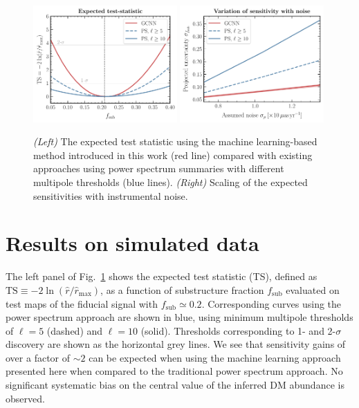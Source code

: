 \documentclass[]{article}
\begin{document}
\begin{figure}[!htbp]
\centering
\includegraphics[width=0.49\textwidth]{figures/TS}
\includegraphics[width=0.49\textwidth]{figures/noise_var}
\caption{\emph{(Left)} The expected test statistic using the machine learning-based method introduced in this work (red line) compared with existing approaches using power spectrum summaries with different multipole thresholds (blue lines). \emph{(Right)} Scaling of the expected sensitivities with instrumental noise.}
\label{fig:experiment}
\end{figure}
 

\section{Results on simulated data}
\label{sec:experiments}

The left panel of Fig.~\ref{fig:experiment} shows the expected test statistic (TS), defined as $\mathrm{TS} \equiv -2\ln(\hat r / \hat r_\mathrm{max})$, as a function of substructure fraction $f_\mathrm{sub}$ evaluated on test maps of the fiducial signal with $f_\mathrm{sub} \simeq 0.2$. Corresponding curves using the power spectrum approach are shown in blue, using minimum multipole thresholds of $\ell = 5$ (dashed) and $\ell = 10$ (solid). Thresholds corresponding to 1- and 2-$\sigma$ discovery are shown as the horizontal grey lines. We see that sensitivity gains of over a factor of $\sim 2$ can be expected when using the machine learning approach presented here when compared to the traditional power spectrum approach. No significant systematic bias on the central value of the inferred DM abundance is observed.
\end{document}
